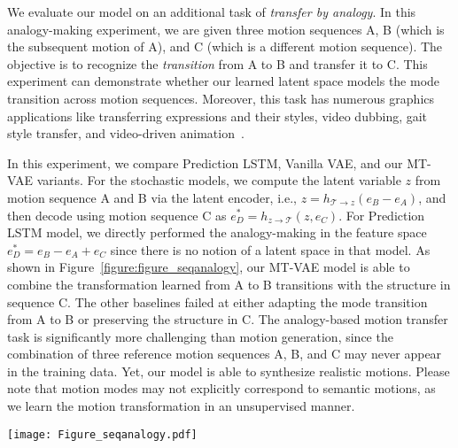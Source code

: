 \documentclass[runningheads]{llncs}
\newcommand{\cutsubsectionup}{\vspace*{-0.1in}}
\begin{document}
We evaluate our model on an additional task of \emph{transfer by analogy}. 
In this analogy-making experiment, we are given three motion sequences A, B (which is the subsequent motion of A), and C (which is a different motion sequence).
The objective is to recognize the \emph{transition} from A to B and transfer it to C. 
This experiment can demonstrate whether our learned latent space models the mode transition across motion sequences.
Moreover, this task has numerous graphics applications like transferring expressions and their styles, video dubbing, gait style transfer, and video-driven animation~\cite{thies2016face2face}.  

In this experiment, we compare Prediction LSTM, Vanilla VAE, and our MT-VAE variants.
For the stochastic models, we compute the latent variable $z$ from motion sequence A and B via the latent encoder, i.e., $z = h_{\mathcal{T} \rightarrow z}(e_B - e_A)$, and then decode using motion sequence C as $e^*_D = h_{z \rightarrow \mathcal{T}}(z, e_C)$.
For Prediction LSTM model, we directly performed the analogy-making in the feature space $e^*_D = e_B - e_A + e_C$ since there is no notion of a latent space in that model.
As shown in Figure~\ref{figure:figure_seqanalogy}, our MT-VAE model is able to combine the transformation learned from A to B transitions with the structure in sequence C. The other baselines failed at either adapting the mode transition from A to B or preserving the structure in C.
The analogy-based motion transfer task is significantly more challenging than motion generation, since the combination of three reference motion sequences A, B, and C may never appear in the training data.
Yet, our model is able to synthesize realistic motions.
Please note that motion modes may not explicitly correspond to semantic motions, as we learn the motion transformation in an unsupervised manner.

\begin{figure*}[t]
\centering
\texttt{[image: Figure\_seqanalogy.pdf]}
\caption{Analogy-based motion transfer.
Given three motion sequences A, B, and C from test set, the objective is to extract the motion mode transition from A to B and then apply it to animate the future starting from sequence C.
For fair comparison, we set the encoder Gaussian distribution parameter $\sigma$ to zero during evaluation.
}
\label{figure:figure_seqanalogy}
\vspace*{-0.2in}
\end{figure*}

\cutsubsectionup
\end{document}
